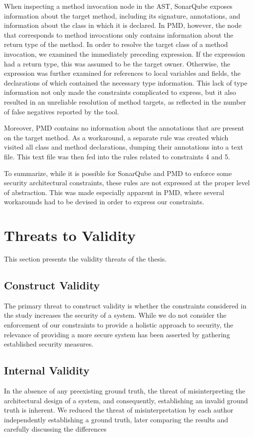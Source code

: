 When inspecting a method invocation node in the AST, SonarQube exposes information about the target method, including its signature, annotations, and information about the class in which it is declared. In PMD, however, the node that corresponds to method invocations only contains information about the return type of the method. In order to resolve the target class of a method invocation, we examined the immediately preceding expression. If the expression had a return type, this was assumed to be the target owner. Otherwise, the expression was further examined for references to local variables and fields, the declarations of which contained the necessary type information. This lack of type information not only made the constraints complicated to express, but it also resulted in an unreliable resolution of method targets, as reflected in the number of false negatives reported by the tool.

Moreover, PMD contains no information about the annotations that are present on the target method. As a workaround, a separate rule was created which visited all class and method declarations, dumping their annotations into a text file. This text file was then fed into the rules related to constraints 4 and 5.

To summarize, while it is possible for SonarQube and PMD to enforce some security architectural constraints, these rules are not expressed at the proper level of abstraction. This was made especially apparent in PMD, where several workarounds had to be devised in order to express our constraints.


\section{Threats to Validity}
This section presents the validity threats of the thesis. 

\subsection{Construct Validity}
The primary threat to construct validity is whether the constraints considered in the study increases the security of a system. While we do not consider the enforcement of our constraints to provide a holistic approach to security, the relevance of providing a more secure system has been asserted by gathering established security measures.

\subsection{Internal Validity}
In the absence of any preexisting ground truth, the threat of misinterpreting the architectural design of a system, and consequently, establishing an invalid ground truth is inherent. We reduced the threat of misinterpretation by each author independently establishing a ground truth, later comparing the results and carefully discussing the differences

